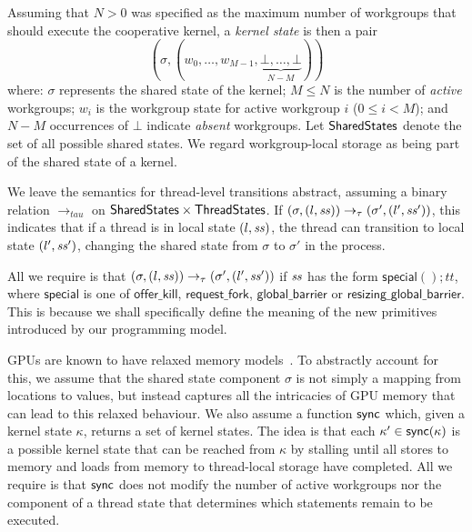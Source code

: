 \documentclass[sigconf]{acmart}
\newcommand{\offerfork}{\mathsf{request\_fork}}
\newcommand{\offerkill}{\mathsf{offer\_kill}}
\newcommand{\globalbarrier}{\mathsf{global\_barrier}}
\newcommand{\resizingglobalbarrier}{\mathsf{resizing\_global\_barrier}}
\begin{document}
{Assuming that $N > 0$ was specified as the maximum number of
workgroups that should execute the cooperative kernel, a \emph{kernel
  state} is then a pair
%
\[
(\sigma, (w_0, \dots, w_{M-1}, \underbrace{\bot, \dots,
\bot}_{N-M}))\]
%
where: $\sigma$ represents the shared state of the kernel; $M \leq N$
is the number of \emph{active} workgroups; $w_i$ is the workgroup
state for active workgroup $i$ ($0 \leq i < M$); and $N-M$ occurrences
of $\bot$ indicate \emph{absent} workgroups.  Let $\mathsf{SharedStates}$
denote the set of all possible shared states.  We regard
workgroup-local storage as being part of the shared state of a kernel.

%
We leave the semantics for thread-level transitions abstract, assuming
a binary relation $\rightarrow_{tau}$ on $\mathsf{SharedStates}{} \times
\mathsf{ThreadStates}{}$.  If $(\sigma, (l, \mathit{ss})) \rightarrow_{\tau}
(\sigma', (l', \mathit{ss}'))$, this indicates that if a thread is in local
state $(l, \mathit{ss})$, the thread can transition to local state $(l',
\mathit{ss}')$, changing the shared state from $\sigma$ to $\sigma'$ in the
process.

All we require is that $(\sigma, (l, \mathit{ss})) \rightarrow_{\tau}
(\sigma', (l', \mathit{ss}'))$ if $\mathit{ss}$ has the form $\mathsf{special}();
\mathit{tt}$, where $\mathsf{special}$ is one of $\offerkill$,
$\offerfork$, $\globalbarrier$ or $\resizingglobalbarrier$.  This is
because we shall specifically define the meaning of the new primitives
introduced by our programming model.

%
GPUs are known to have relaxed memory models~\cite{ABDGKPSW-2015}.  To abstractly
account for this, we assume that the shared state component $\sigma$
is not simply a mapping from locations to values, but instead
captures all the intricacies of GPU memory that can lead to this
relaxed behaviour.  We also assume a function $\mathsf{sync}$ which, given a
kernel state $\kappa$, returns a set of kernel states.  The idea is
that each $\kappa' \in \mathsf{sync}(\kappa)$ is a possible kernel state that
can be reached from $\kappa$ by stalling until all stores to memory
and loads from memory to thread-local storage have completed.  All we
require is that $\mathsf{sync}$ does not modify the number of active
workgroups nor the component of a thread state that determines which
statements remain to be executed.

\begin{figure}
\begin{center}


\end{center}
\end{figure}}
\end{document}
